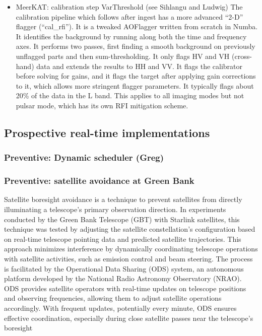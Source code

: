 \begin{itemize}
\item MeerKAT: calibration step VarThreshold  (see Sihlangu and Ludwig)
The calibration pipeline which follows after ingest has a more advanced “2-D” flagger (“cal\_rfi”). It is a tweaked AOFlagger written from scratch in Numba. It identifies the background by running along both the time and frequency axes. It performs two passes, first finding a smooth background on previously unflagged parts and then sum-thresholding. It only flags HV and VH (cross-hand) data and extends the results to HH and VV. It flags the calibrator before solving for gains, and it flags the target after applying gain corrections to it, which allows more stringent flagger parameters. It typically flags about 20\% of the data in the L band. This applies to all imaging modes but not pulsar mode, which has its own RFI mitigation scheme.


\end{itemize}

\subsection{Prospective real-time implementations}
\label{subsection:hardware:catalog:prospective}

\subsubsection{Preventive: Dynamic scheduler (Greg)}
\subsubsection{Preventive: satellite avoidance at Green Bank}
Satellite boresight avoidance is a technique to prevent satellites from directly illuminating a telescope's primary observation direction. In experiments conducted by the Green Bank Telescope (GBT) with Starlink satellites, this technique was tested \cite{nhan2024spectrumcoexistencedemonstrationeffectiveness} by adjusting the satellite constellation's configuration based on real-time telescope pointing data and predicted satellite trajectories. This approach minimizes interference by dynamically coordinating telescope operations with satellite activities, such as emission control and beam steering. The process is facilitated by the Operational Data Sharing (ODS) system, an autonomous platform developed by the National Radio Astronomy Observatory (NRAO). ODS provides satellite operators with real-time updates on telescope positions and observing frequencies, allowing them to adjust satellite operations accordingly. With frequent updates, potentially every minute, ODS ensures effective coordination, especially during close satellite passes near the telescope’s boresight

